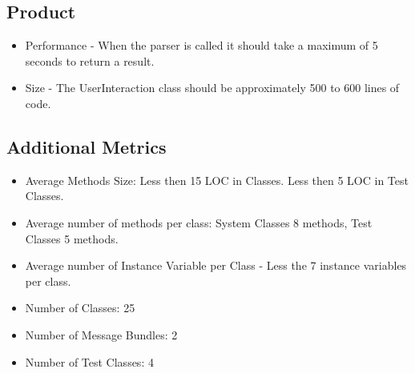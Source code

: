 \documentclass{article}
\begin{document}
		\subsection*{Product}
			\begin{itemize}
				\item Performance - When the parser is called it should take a maximum of 5 seconds to return a result.
				\item Size - The UserInteraction class should be approximately 500 to 600 lines of code.
			\end{itemize}
		\subsection*{Additional Metrics}
			\begin{itemize}
				\item Average Methods Size: Less then 15 LOC in Classes. Less then 5 LOC in Test Classes.
				\item Average number of methods per class: System Classes 8 methods, Test Classes 5 methods.
				\item Average number of Instance Variable per Class - Less the 7 instance variables per class.
				\item Number of Classes: 25
				\item Number of Message Bundles: 2
				\item Number of Test Classes: 4
			\end{itemize}
	
	
\end{document}
